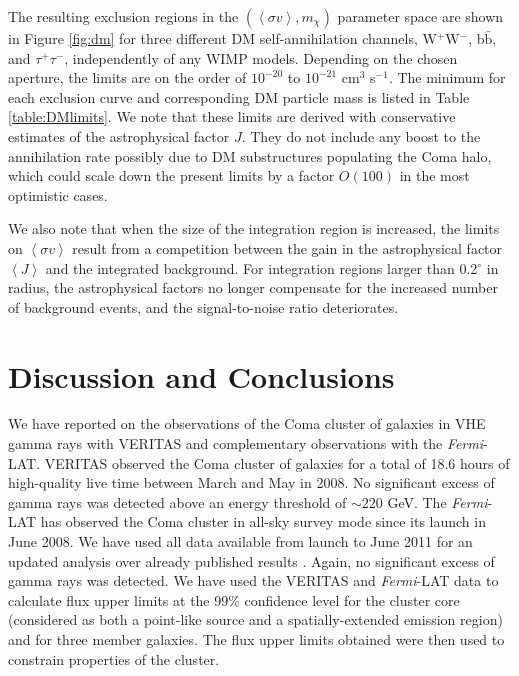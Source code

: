 \documentclass[12pt,manuscript]{aastex}
\newcommand{\expval}[1]{\left\langle #1 \right\rangle}
\begin{document}
The resulting exclusion regions in the $(\expval{\sigma v}, m_{\chi})$ parameter space are shown in
Figure \ref{fig:dm} for three different DM self-annihilation channels, W$^{+}$W$^{-}$,
b$\bar{\mathrm{b}}$, and $\tau^{+}\tau^{-}$, independently of any WIMP models. Depending on the
chosen aperture, the limits are on the order of $10^{-20}$ to $10^{-21}$ cm$^{3}$ s$^{-1}$. The
minimum for each exclusion curve and corresponding DM particle mass is listed in Table
\ref{table:DMlimits}. We note that these limits are derived with conservative estimates of the
astrophysical factor $J$. They do not include any boost to the annihilation rate possibly due to DM
substructures populating the Coma halo, which could scale down the present limits by a factor
$O(100)$ in the most optimistic cases.

We also note that when the size of the integration region is increased, the limits on
$\expval{\sigma v}$ result from a competition between the gain in the astrophysical factor
$\expval{J}$ and the integrated background. For integration regions larger than 0.2$^{\circ}$ in
radius, the astrophysical factors no longer compensate for the increased number of background
events, and the signal-to-noise ratio deteriorates.

%
%

\section{Discussion and Conclusions}
We have reported on the observations of the Coma cluster of galaxies in VHE gamma rays with VERITAS
and complementary observations with the \emph{Fermi}-LAT. VERITAS observed the Coma cluster of
galaxies for a total of 18.6 hours of high-quality live time between March and May in 2008. No
significant excess of gamma rays was detected above an energy threshold of $\sim 220$ GeV. The
\emph{Fermi}-LAT has observed the Coma cluster in all-sky survey mode since its launch in June
2008. We have used all data available from launch to June 2011 for an updated analysis over already
published results \citep{article:Ackermann_etal:2010}. Again, no significant excess of gamma rays
was detected. We have used the VERITAS and \emph{Fermi}-LAT data to calculate flux upper limits at
the 99\% confidence level for the cluster core (considered as both a point-like source and a
spatially-extended emission region) and for three member galaxies. The flux upper limits obtained
were then used to constrain properties of the cluster.
\end{document}
